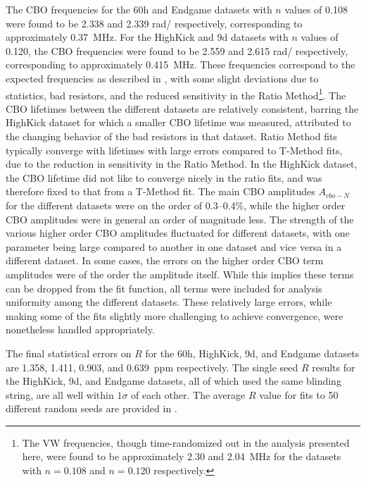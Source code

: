 The CBO frequencies for the 60h and Endgame datasets with $n$ values of 0.108 were found to be 2.338 and 2.339 rad/\mus{} respectively, corresponding to approximately \SI{0.37}{MHz}. For the HighKick and 9d datasets with $n$ values of 0.120, the CBO frequencies were found to be 2.559 and 2.615 rad/\mus{} respectively, corresponding to approximately \SI{0.415}{MHz}. These frequencies correspond to the expected frequencies as described in , with some slight deviations due to statistics, bad resistors, and the reduced sensitivity in the Ratio Method\footnote{The VW frequencies, though time-randomized out in the analysis presented here, were found to be approximately \SI{2.30}{} and \SI{2.04}{MHz} for the datasets with $n=0.108$ and $n=0.120$ respectively.}. The CBO lifetimes between the different datasets are relatively consistent, barring the HighKick dataset for which a smaller CBO lifetime was measured, attributed to the changing behavior of the bad resistors in that dataset. Ratio Method fits typically converge with lifetimes with large errors compared to T-Method fits, due to the reduction in sensitivity in the Ratio Method. In the HighKick dataset, the CBO lifetime did not like to converge nicely in the ratio fits, and was therefore fixed to that from a T-Method fit. The main CBO amplitudes $A_{cbo-N}$ for the different datasets were on the order of 0.3--0.4\%, while the higher order CBO amplitudes were in general an order of magnitude less. The strength of the various higher order CBO amplitudes fluctuated for different datasets, with one parameter being large compared to another in one dataset and vice versa in a different dataset. In some cases, the errors on the higher order CBO term amplitudes were of the order the amplitude itself. While this implies these terms can be dropped from the fit function, all terms were included for analysis uniformity among the different datasets. These relatively large errors, while making some of the fits slightly more challenging to achieve convergence, were nonetheless handled appropriately.



The final statistical errors on $R$ for the 60h, HighKick, 9d, and Endgame datasets are \SI{1.358}{}, \SI{1.411}{}, \SI{0.903}{}, and \SI{0.639}{ppm} respectively. The single seed $R$ results for the HighKick, 9d, and Endgame datasets, all of which used the same blinding string, are all well within $1\sigma$ of each other. The average $R$ value for fits to 50 different random seeds are provided in .


